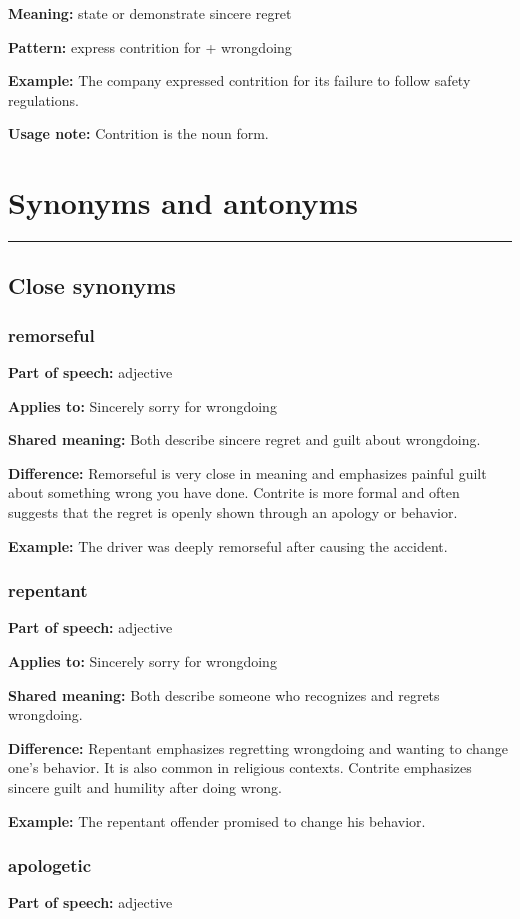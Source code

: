 \documentclass[11pt]{article}
\newcommand{\sectionrule}{\par\vspace{-0.5em}\noindent\textcolor{Accent}{\rule{\linewidth}{0.6pt}}\par}
\begin{document}
\textbf{Meaning:} state or demonstrate sincere regret

\textbf{Pattern:} express contrition for + wrongdoing

\textbf{Example:} The company expressed contrition for its failure to follow safety regulations.

\textbf{Usage note:} Contrition is the noun form.

\section{Synonyms and antonyms}
\sectionrule
\subsection{Close synonyms}
\subsubsection{remorseful}
\textbf{Part of speech:} adjective

\textbf{Applies to:} Sincerely sorry for wrongdoing

\textbf{Shared meaning:} Both describe sincere regret and guilt about wrongdoing.

\textbf{Difference:} Remorseful is very close in meaning and emphasizes painful guilt about something wrong you have done. Contrite is more formal and often suggests that the regret is openly shown through an apology or behavior.

\textbf{Example:} The driver was deeply remorseful after causing the accident.

\subsubsection{repentant}
\textbf{Part of speech:} adjective

\textbf{Applies to:} Sincerely sorry for wrongdoing

\textbf{Shared meaning:} Both describe someone who recognizes and regrets wrongdoing.

\textbf{Difference:} Repentant emphasizes regretting wrongdoing and wanting to change one's behavior. It is also common in religious contexts. Contrite emphasizes sincere guilt and humility after doing wrong.

\textbf{Example:} The repentant offender promised to change his behavior.

\subsubsection{apologetic}
\textbf{Part of speech:} adjective
\end{document}
